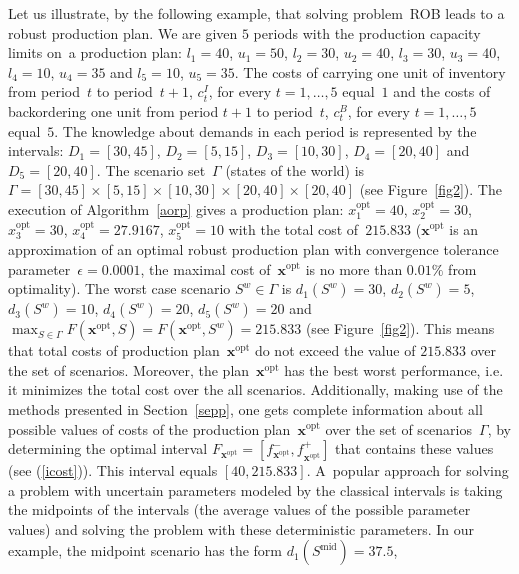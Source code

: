 \documentclass[11pt]{article}
\begin{document}
Let us illustrate, by the following example, 
that solving  problem~\textsc{ROB}  leads to a robust  production
plan.   We are given $5$ periods with 
the production capacity limits on~a production plan:
$l_1=40$, $u_1=50$,  $l_2=30$, $u_2=40$,
$l_3=30$, $u_3=40$, $l_4=10$, $u_4=35$ and $l_5=10$, $u_5=35$.
The costs of carrying one unit
of inventory from period~$t$ to period~$t+1$, $c^I_t$, for every
$t=1,\ldots,5$  equal~$1$ and  
 the costs of
backordering one unit from period $t+1$ to period~$t$, $c^B_t$, for every
 $t=1,\ldots,5$ equal~$5$.
The knowledge about
 demands in each period is represented by the intervals: $D_1=[30,45]$, 
 $D_2=[5,15]$,  $D_3=[10,30]$,  $D_4=[20,40]$ and  $D_5=[20,40]$.
 The scenario set~$\Gamma$ (states of the world) is 
$\Gamma= [30,45]\times [5,15]\times [10,30] \times [20,40] \times [20,40]$
(see Figure~\ref{fig2}).
The execution of Algorithm~\ref{aorp} gives a  production plan:
$x^{\text{opt}}_1=40$, $x^{\text{opt}}_2=30$,  $x^{\text{opt}}_3=30$,
$x^{\text{opt}}_4=27.9167$,  $x^{\text{opt}}_5=10$ with the total cost of~$215.833$
($\pmb{x}^{\text{opt}}$ is an approximation of  an optimal robust production plan with 
convergence tolerance parameter~$\epsilon=0.0001$, 
the maximal cost of~$\pmb{x}^{\text{opt}}$ is no more than $0.01\%$
from optimality).
The worst case scenario $S^{w}\in \Gamma$ is $d_1(S^{w})=30$, 
$d_2(S^{w})=5$, $d_3(S^{w})=10$, $d_4(S^{w})=20$, $d_5(S^{w})=20$
 and
$\max_{S\in \Gamma}F(\pmb{x}^{\text{opt}},S)=F(\pmb{x}^{\text{opt}},S^{w})=215.833$
(see Figure~\ref{fig2}).
This means that  total costs of production plan~$\pmb{x}^{\text{opt}}$ 
do not exceed the value of $215.833$ over the set of scenarios.
Moreover,  the plan~$\pmb{x}^{\text{opt}}$ has the best worst performance, i.e.
it minimizes the total cost over the all scenarios. 
Additionally, making use of the methods presented in Section~\ref{sepp},
one gets  complete information about all
 possible values of costs of the production plan~$\pmb{x}^{\text{opt}}$
 over the set of scenarios~$\Gamma$,
 by determining 
the optimal interval
 $F_{\pmb{x}^{\text{opt}}}=[f_{\pmb{x}^{\text{opt}}}^{-},f_{\pmb{x}^{\text{opt}}}^{+}]$  
 that contains
 these values (see (\ref{icost})). This interval equals $[40, 215.833]$.
A~popular approach for solving a problem with uncertain  parameters
 modeled by the classical intervals is taking the midpoints of the intervals (the average values of
 the possible parameter values)
 and solving the problem with these deterministic parameters.
 In our example, the midpoint scenario has the form 
 $d_1(S^{\text{mid}})=37.5$, 
\end{document}
